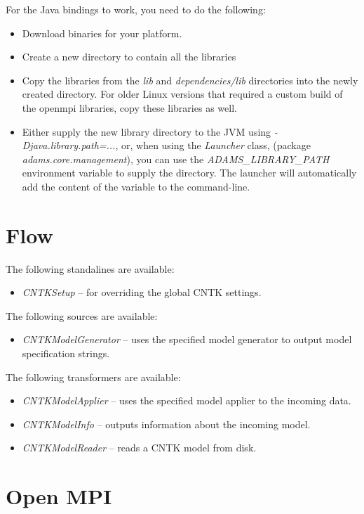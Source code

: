 \documentclass[a4paper]{book}
\begin{document}
\noindent For the Java bindings to work, you need to do the following:
\begin{itemize}
  \item Download binaries for your platform.
  \item Create a new directory to contain all the libraries
  \item Copy the libraries from the \textit{lib} and \textit{dependencies/lib}
  directories into the newly created directory. For older Linux versions that
  required a custom build of the openmpi libraries, copy these libraries as well.
  \item Either supply the new library directory to the JVM using
  \textit{-Djava.library.path=...}, or, when using the \textit{Launcher} class,
  (package \textit{adams.core.management}), you can use the
  \textit{ADAMS\_LIBRARY\_PATH} environment variable to supply the directory.
  The launcher will automatically add the content of the variable to the
  command-line.
\end{itemize}


\chapter{Flow}
The following standalines are available:
\begin{itemize}
  \item \textit{CNTKSetup} -- for overriding the global CNTK settings.
\end{itemize}
The following sources are available:
\begin{itemize}
  \item \textit{CNTKModelGenerator} -- uses the specified model generator
  to output model specification strings.
\end{itemize}
The following transformers are available:
\begin{itemize}
  \item \textit{CNTKModelApplier} -- uses the specified model applier to the
  incoming data.
  \item \textit{CNTKModelInfo} -- outputs information about the incoming model.
  \item \textit{CNTKModelReader} -- reads a CNTK model from disk.
\end{itemize}

\chapter{Open MPI}
\end{document}
